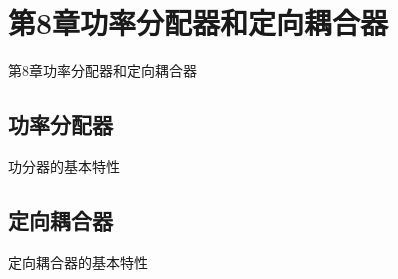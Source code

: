 \section{第8章\quad 功率分配器和定向耦合器}
\begin{frame}{第8章\quad 功率分配器和定向耦合器}

\end{frame}

\subsection{功率分配器}
\begin{frame}{功分器的基本特性}

\end{frame}

\subsection{定向耦合器}
\begin{frame}{定向耦合器的基本特性}

\end{frame}